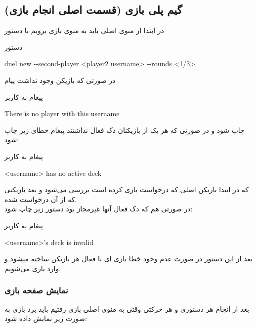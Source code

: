 \documentclass[]{article}
\begin{document}
\subsection*{{\titr گیم پلی بازی (قسمت اصلی انجام بازی)}}
در ابتدا از منوی اصلی باید به منوی بازی برویم با دستور
\begin{mybox}[colback=yellow]{دستور}
	\begin{latin}	
		duel new -{}-second-player <player2 username> -{}-rounds <1/3>
	\end{latin}
\end{mybox}
    در صورتی که بازیکن  وجود نداشت پیام
\begin{mybox}[colback=yellow]{پیغام به کاربر}
	\begin{latin}	
		There is no player with this username
	\end{latin}
\end{mybox}
    چاپ شود و در صورتی که هر یک از بازیکنان دک فعال نداشتند پیغام خطای زیر 
    چاپ شود:
\begin{mybox}[colback=yellow]{پیغام به کاربر}
	\begin{latin}	
		<username> has no active deck
	\end{latin}
\end{mybox}
    که در ابتدا بازیکن اصلی که درخواست بازی کرده است بررسی می‌شود و بعد 
    بازیکنی که از آن درخواست شده.
\\
    در صورتی هم که دک فعال آنها غیرمجاز بود دستور زیر چاپ شود:
\begin{mybox}[colback=yellow]{پیغام به کاربر}
	\begin{latin}	
		<username>’s deck is invalid
	\end{latin}
\end{mybox}
    بعد از این دستور در صورت عدم وجود خطا بازی ای با  فعال هر 
    بازیکن ساخته میشود و وارد بازی می‌شویم.
\subsubsection*{{\titr نمایش صفحه بازی}}
بعد از انجام هر دستوری و هر حرکتی وقتی به منوی اصلی بازی رفتیم باید برد 
بازی به صورت زیر نمایش داده شود:
\end{document}
